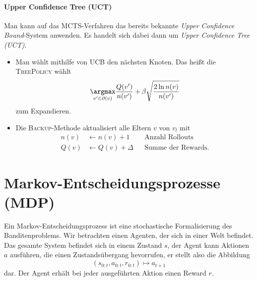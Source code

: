 \documentclass[ngerman]{../LaTeX-Templates/Paper/paper}
\begin{document}
\paragraph{Upper Confidence Tree (UCT)}
Man kann auf das MCTS-Verfahren das bereits bekannte {\itshape Upper Confidence Bound}-System anwenden. Es handelt sich dabei dann um {\itshape Upper Confidence Tree (UCT)}.
\begin{itemize}
	\item Man wählt mithilfe von UCB den nächsten Knoten. Das heißt die \textsc{TreePolicy} wählt
	\begin{equation*}
		\underset{v'\in\partial(v)}\argmax\frac{Q(v')}{n(v')}+\beta\sqrt{\frac{2\ln n(v)}{n(v')}}
	\end{equation*}
	zum Expandieren.
	\item Die \textsc{Backup}-Methode aktualisiert alle Eltern $v$ von $v_l$ mit
	\begin{align*}
		n(v)&\leftarrow n(v)+1&&\text{Anzahl Rollouts}\\
		Q(v)&\leftarrow Q(v)+\Delta&&\text{Summe der Rewards.}
	\end{align*}
\end{itemize}


\section{Markov-Entscheidungsprozesse (MDP)}
Ein Markov-Entscheidungsprozess ist eine stochastische Formalisierung des Banditenproblems. Wir betrachten einen Agenten, der sich in einer Welt befindet. Das gesamte System befindet sich in einem Zustand $s$, der Agent kann Aktionen $a$ ausführen, die einen Zustandsübergang hevorrufen, er stellt also die Abbildung
\begin{equation*}
	(s_{0:t},a_{0:t},r_{0:t})\mapsto a_{t+1}
\end{equation*}
dar.
Der Agent erhält bei jeder ausgeführten Aktion einen Reward $r$.
\end{document}
